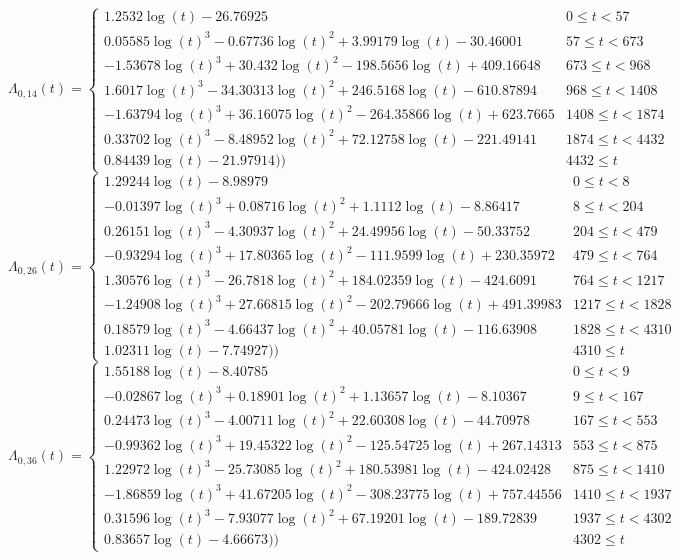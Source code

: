 \documentclass[12pt,PhD,twoside,openright]{muthesis}
\begin{document}
\begin{equation}
\Lambda_{0,14}(t)=\begin{cases} 1.2532\log(t)-26.76925 & 0 \le t < 57 \\ 0.05585\log(t)^3-0.67736\log(t)^2+3.99179\log(t)-30.46001 & 57 \le t < 673 \\ -1.53678\log(t)^3+30.432\log(t)^2-198.5656\log(t)+409.16648 & 673 \le t < 968 \\ 1.6017\log(t)^3-34.30313\log(t)^2+246.5168\log(t)-610.87894 & 968 \le t < 1408 \\ -1.63794\log(t)^3+36.16075\log(t)^2-264.35866\log(t)+623.7665 & 1408 \le t < 1874 \\ 0.33702\log(t)^3-8.48952\log(t)^2+72.12758\log(t)-221.49141 & 1874 \le t < 4432 \\ 0.84439\log(t)-21.97914)) & 4432 \le t \label{eq:CH-Five-14}\end{cases}
\end{equation}
\begin{equation}
\Lambda_{0,26}(t)=\begin{cases} 1.29244\log(t)-8.98979 & 0 \le t < 8 \\ -0.01397\log(t)^3+0.08716\log(t)^2+1.1112\log(t)-8.86417 & 8 \le t < 204 \\ 0.26151\log(t)^3-4.30937\log(t)^2+24.49956\log(t)-50.33752 & 204 \le t < 479 \\ -0.93294\log(t)^3+17.80365\log(t)^2-111.9599\log(t)+230.35972 & 479 \le t < 764 \\ 1.30576\log(t)^3-26.7818\log(t)^2+184.02359\log(t)-424.6091 & 764 \le t < 1217 \\ -1.24908\log(t)^3+27.66815\log(t)^2-202.79666\log(t)+491.39983 & 1217 \le t < 1828 \\ 0.18579\log(t)^3-4.66437\log(t)^2+40.05781\log(t)-116.63908 & 1828 \le t < 4310 \\ 1.02311\log(t)-7.74927)) & 4310 \le t \label{eq:CH-Five-26}\end{cases}
\end{equation}
\begin{equation}
\Lambda_{0,36}(t)=\begin{cases} 1.55188\log(t)-8.40785 & 0 \le t < 9 \\ -0.02867\log(t)^3+0.18901\log(t)^2+1.13657\log(t)-8.10367 & 9 \le t < 167 \\ 0.24473\log(t)^3-4.00711\log(t)^2+22.60308\log(t)-44.70978 & 167 \le t < 553 \\ -0.99362\log(t)^3+19.45322\log(t)^2-125.54725\log(t)+267.14313 & 553 \le t < 875 \\ 1.22972\log(t)^3-25.73085\log(t)^2+180.53981\log(t)-424.02428 & 875 \le t < 1410 \\ -1.86859\log(t)^3+41.67205\log(t)^2-308.23775\log(t)+757.44556 & 1410 \le t < 1937 \\ 0.31596\log(t)^3-7.93077\log(t)^2+67.19201\log(t)-189.72839 & 1937 \le t < 4302 \\ 0.83657\log(t)-4.66673)) & 4302 \le t \label{eq:CH-Five-36}\end{cases}
\end{equation}
\end{document}
